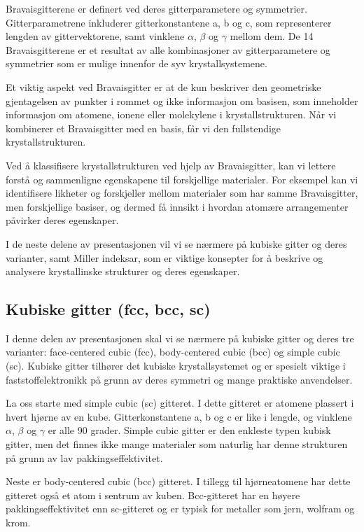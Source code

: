 Bravaisgitterene er definert ved deres gitterparametere og symmetrier. Gitterparametrene inkluderer gitterkonstantene a, b og c, som representerer lengden av gittervektorene, samt vinklene $\alpha$, $\beta$ og $\gamma$ mellom dem. De 14 Bravaisgitterene er et resultat av alle kombinasjoner av gitterparametere og symmetrier som er mulige innenfor de syv krystallsystemene.

Et viktig aspekt ved Bravaisgitter er at de kun beskriver den geometriske gjentagelsen av punkter i rommet og ikke informasjon om basisen, som inneholder informasjon om atomene, ionene eller molekylene i krystallstrukturen. Når vi kombinerer et Bravaisgitter med en basis, får vi den fullstendige krystallstrukturen.

Ved å klassifisere krystallstrukturen ved hjelp av Bravaisgitter, kan vi lettere forstå og sammenligne egenskapene til forskjellige materialer. For eksempel kan vi identifisere likheter og forskjeller mellom materialer som har samme Bravaisgitter, men forskjellige basiser, og dermed få innsikt i hvordan atomære arrangementer påvirker deres egenskaper.

I de neste delene av presentasjonen vil vi se nærmere på kubiske gitter og deres varianter, samt Miller indeksar, som er viktige konsepter for å beskrive og analysere krystallinske strukturer og deres egenskaper.

\subsection*{Kubiske gitter (fcc, bcc, sc)}
I denne delen av presentasjonen skal vi se nærmere på kubiske gitter og deres tre varianter: face-centered cubic (fcc), body-centered cubic (bcc) og simple cubic (sc). Kubiske gitter tilhører det kubiske krystallsystemet og er spesielt viktige i faststoffelektronikk på grunn av deres symmetri og mange praktiske anvendelser.

La oss starte med simple cubic (sc) gitteret. I dette gitteret er atomene plassert i hvert hjørne av en kube. Gitterkonstantene a, b og c er like i lengde, og vinklene $\alpha$, $\beta$ og $\gamma$ er alle 90 grader. Simple cubic gitter er den enkleste typen kubisk gitter, men det finnes ikke mange materialer som naturlig har denne strukturen på grunn av lav pakkingseffektivitet.

Neste er body-centered cubic (bcc) gitteret. I tillegg til hjørneatomene har dette gitteret også et atom i sentrum av kuben. Bcc-gitteret har en høyere pakkingseffektivitet enn sc-gitteret og er typisk for metaller som jern, wolfram og krom.

